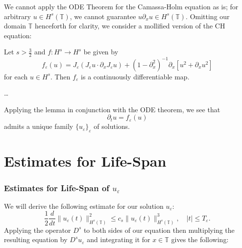 \documentclass{beamer}
\newcommand{\p}{\partial}
\newcommand{\ci}{\mathbb{T}}
\newcommand{\ee}{\varepsilon}
\begin{document}
\begin{frame}
	We cannot apply the ODE Theorem for the Camassa-Holm equation as is; for
	arbitrary $u\in H^s(\ci)$, we cannot guarantee $u\p_x u \in H^s(\ci)$.
	Omitting our domain $\ci$ henceforth for clarity, we consider a mollified version of the CH equation:
	\begin{lemma}
		\label{mollified_ch}
Let $s > \frac{3}{2}$ and $f:H^s \to H^s$ be given by 
\begin{equation*}
f_\ee(u) = J_\varepsilon ( J_\varepsilon u \cdot  \partial_x J_\varepsilon u)
+ (1-\p_x^2)^{-1} \p_x \left
[u^2 + \p_x u^2 \right ] 
\end{equation*}
for each $u \in H^s$.  Then $f_\ee$  is a continuously differentiable map.
\end{lemma}

\dots

Applying the lemma in conjunction with the ODE theorem, we see that 
\begin{equation*}
	\p_t u= f_\ee (u)
\end{equation*}
admits a unique family $\{u_\ee\}_\ee$ of solutions.

\end{frame}

\section{Estimates for Life-Span}
\begin{frame}
	\frametitle{Estimates for Life-Span of $u_\ee$}
We will derive the following estimate for our solution $u_\ee$:
\begin{equation*} 
\frac 12
\frac{d}{dt}
  \|u_\ee(t)\|_{H^{s}(\ci)}^2
\le
c_s
 \|u_\ee(t)\|_{H^{s}(\ci)}^3,
 \quad
|t| \le T_\ee.
\end{equation*}
Applying  the operator $D^s$ to  both sides of our equation
then  multiplying the resulting equation by $D^s u_\ee$
and integrating it for $x\in\ci$ gives the following:
\end{frame}
\end{document}
